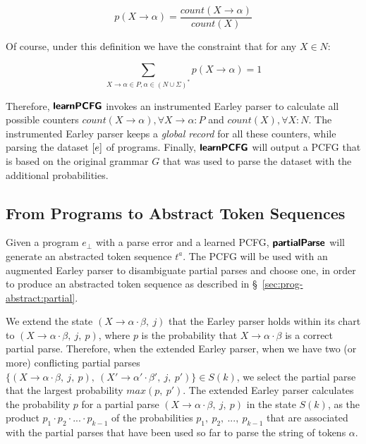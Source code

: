 \begin{equation*}
    p(X \rightarrow \alpha) = \frac{count(X \rightarrow \alpha)}{count(X)}
\end{equation*}

Of course, under this definition we have the constraint that for any $X \in N$:

\begin{equation*}
    \sum_{X \rightarrow \alpha \in P, \alpha \in (N \cup \Sigma)^{\ast}}{p(X \rightarrow \alpha)} = 1
\end{equation*}

Therefore, $\bm{\mathsf{learnPCFG}}$ invokes an instrumented Earley parser to calculate
all possible counters $count(X \rightarrow \alpha), \forall X \rightarrow
\alpha: P$ and $count(X), \forall X: N$. The instrumented Earley parser keeps a
\emph{global record} for all these counters, while parsing the dataset
$[e]$ of programs. Finally, $\bm{\mathsf{learnPCFG}}$ will output a PCFG that is
based on the original grammar $G$ that was used to parse the dataset with the
additional probabilities.

\subsection{From Programs to Abstract Token Sequences}

Given a program $e_{\bot}$ with a parse error and a learned PCFG, $\bm{\mathsf{partialParse}}$
will generate an abstracted token sequence $t^a$. The PCFG will be used with an
augmented Earley parser to disambiguate partial parses and choose one, in order
to produce an abstracted token sequence as described in
\S~\ref{sec:prog-abstract:partial}.

We extend the state $(X \rightarrow \alpha \cdot \beta,\ j)$ that the Earley
parser holds within its chart to $(X \rightarrow \alpha \cdot \beta,\ j,\ p)$,
where $p$ is the probability that $X \rightarrow \alpha \cdot \beta$ is a
correct partial parse. Therefore, when the extended Earley parser, when we have
two (or more) conflicting partial parses $\{(X \rightarrow \alpha \cdot \beta,\
j,\ p),\ (X' \rightarrow \alpha' \cdot \beta',\ j,\ p')\} \in S(k)$, we select
the partial parse that the largest probability $max(p,\ p')$. The extended
Earley parser calculates the probability $p$ for a partial parse $(X \rightarrow
\alpha \cdot \beta,\ j,\ p)$ in the state $S(k)$, as the product $p_1 \cdot p_2
\cdot ... \cdot p_{k-1}$ of the probabilities $p_1,\ p_2,\ ...,\ p_{k-1}$ that
are associated with the partial parses that have been used so far to parse the
string of tokens $\alpha$.




